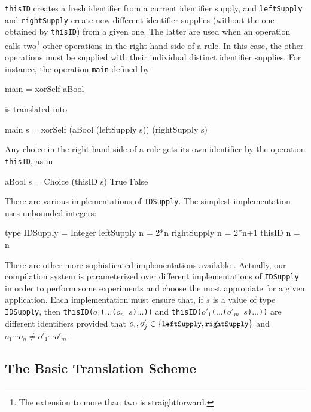 \documentclass{llncs}
\newcommand{\code}[1]{\mbox{\small\texttt{#1}}}
\begin{document}
\code{thisID} creates a fresh identifier from a current
identifier supply, and
\code{leftSupply} and \code{rightSupply} create
new different identifier supplies (without the one obtained
by \code{thisID}) from a given one.
The latter are used when an operation calls two\footnote{The
extension to more than two is straightforward.}
other operations in the right-hand side of a rule. In this case,
the other operations must be supplied with their individual distinct
identifier supplies. For instance, the operation \code{main}
defined by
\label{sec:xor-main}
\begin{curry}
  main = xorSelf aBool
\end{curry}
is translated into
\begin{haskell}
  main s = xorSelf (aBool (leftSupply s)) (rightSupply s)
\end{haskell}
Any choice in the right-hand side of a rule gets its own identifier
by the operation \code{thisID}, as in
\begin{haskell}
  aBool s = Choice (thisID s) True False
\end{haskell}
There are various implementations of \code{IDSupply}.
The simplest implementation uses unbounded integers:
\begin{haskell}
  type IDSupply = Integer
  leftSupply  n = 2*n
  rightSupply n = 2*n+1
  thisID      n = n
\end{haskell}
There are other more sophisticated implementations available
\cite{AugustssonRittriSynek94}.
Actually, our compilation system is parameterized over different
implementations of \code{IDSupply}
in order to perform some experiments and choose
the most appropiate for a given application.
Each implementation must ensure that, if $s$ is a value of type
\code{IDSupply}, then \code{thisID($o_1$($\ldots$($o_n$ $s$)$\ldots$))}
and \code{thisID($o'_1$($\ldots$($o'_m$ $s$)$\ldots$))}
are different identifiers provided that
$o_i,o'_j \in \{\code{leftSupply},\code{rightSupply}\}$
and $o_1\cdots o_n \neq o'_1\cdots o'_m$.

\subsection{The Basic Translation Scheme}
\end{document}
